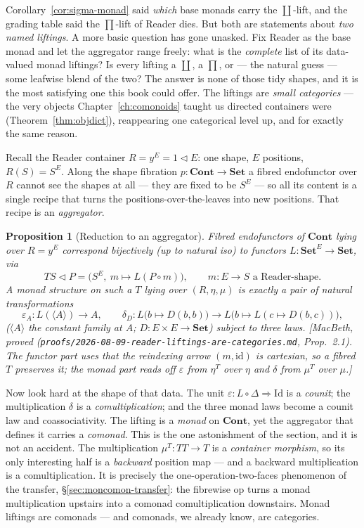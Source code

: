 \documentclass[11pt,a4paper]{book}
\newcommand{\Set}{\mathbf{Set}}
\newcommand{\Cont}{\mathbf{Cont}}
\newcommand{\y}{y}
\newcommand{\cont}[2]{#1 \triangleleft #2}
\newcommand{\id}{\mathrm{id}}
\theoremstyle{plain}
\newtheorem{Proposition}[Theorem]{Proposition}
\theoremstyle{definition}
\theoremstyle{remark}
\newcommand{\prov}[1]{\hfill\textsf{\footnotesize[#1]}}
\begin{document}
Corollary~\ref{cor:sigma-monad} said \emph{which} base monads carry the $\coprod$-lift, and the
grading table said the $\prod$-lift of Reader dies. But both are statements about \emph{two named
liftings}. A more basic question has gone unasked. Fix Reader as the base monad and let the
aggregator range freely: what is the \emph{complete} list of its data-valued monad liftings? Is every
lifting a $\coprod$, a $\prod$, or --- the natural guess --- some leafwise blend of the two? The
answer is none of those tidy shapes, and it is the most satisfying one this book could offer. The
liftings are \emph{small categories} --- the very objects Chapter~\ref{ch:comonoids} taught us
directed containers were (Theorem~\ref{thm:objdict}), reappearing one categorical level up, and for
exactly the same reason.

Recall the Reader container $R=\y^{E}=\cont 1 E$: one shape, $E$ positions, $R(S)=S^{E}$. Along the
shape fibration $p\colon\Cont\to\Set$ a fibred endofunctor over $R$ cannot see the shapes at all ---
they are fixed to be $S^{E}$ --- so all its content is a single recipe that turns the
positions-over-the-leaves into new positions. That recipe is an \emph{aggregator}.

\begin{Proposition}[Reduction to an aggregator]\label{prop:reader-reduction}
Fibred endofunctors of $\Cont$ lying over $R=\y^{E}$ correspond bijectively (up to natural iso) to
functors $L\colon\Set^{E}\to\Set$, via
\[
  T\cont S P=\bigl(S^{E},\ m\mapsto L(P\circ m)\bigr),\qquad m\colon E\to S \text{ a Reader-shape.}
\]
A monad structure on such a $T$ lying over $(R,\eta,\mu)$ is exactly a pair of natural
transformations
\[
   \varepsilon_{A}\colon L(\langle A\rangle)\to A,
   \qquad
   \delta_{D}\colon L\bigl(b\mapsto D(b,b)\bigr)\longrightarrow L\bigl(b\mapsto L(c\mapsto D(b,c))\bigr),
\]
($\langle A\rangle$ the constant family at $A$; $D\colon E\times E\to\Set$) subject to three laws.
\prov{MacBeth, proved (\texttt{proofs/2026-08-09-reader-liftings-are-categories.md}, Prop.~2.1). The
functor part uses that the reindexing arrow $(m,\id)$ is cartesian, so a fibred $T$ preserves it; the
monad part reads off $\varepsilon$ from $\eta^{T}$ over $\eta$ and $\delta$ from $\mu^{T}$ over
$\mu$.}
\end{Proposition}

Now look hard at the shape of that data. The unit $\varepsilon\colon L\circ\Delta\Rightarrow\mathrm{Id}$
is a \emph{counit}; the multiplication $\delta$ is a \emph{comultiplication}; and the three monad laws
become a counit law and coassociativity. The lifting is a \emph{monad} on $\Cont$, yet the aggregator
that defines it carries a \emph{comonad}. This is the one astonishment of the section, and it is not
an accident. The multiplication $\mu^{T}\colon TT\to T$ is a \emph{container morphism}, so its only
interesting half is a \emph{backward} position map --- and a backward multiplication is a
comultiplication. It is precisely the one-operation-two-faces phenomenon of the transfer,
\S\ref{sec:moncomon-transfer}: the fibrewise op turns a monad multiplication upstairs into a comonad
comultiplication downstairs. Monad liftings are comonads --- and comonads, we already know, are
categories.
\end{document}
